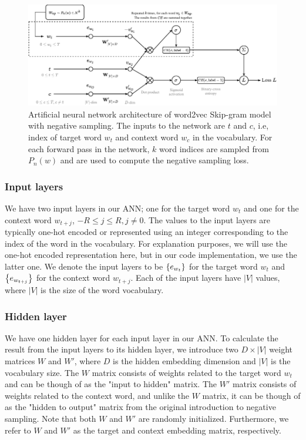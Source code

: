 \begin{figure}[ht]
    \centering
    \includegraphics[width=16cm]{thesis/figures/word2vec-sgns_cropped.pdf}
    \caption{Artificial neural network architecture of word2vec Skip-gram model with negative sampling. The inputs to the network are $t$ and $c$, i.e, index of target word $w_t$ and context word $w_c$ in the vocabulary. For each forward pass in the network, $k$ word indices are sampled from $P_n(w)$ and are used to compute the negative sampling loss.}
    \label{fig:word2vec-skip-gram-negative-sampling}
\end{figure}

\subsubsection{Input layers}
We have two input layers in our ANN; one for the target word $w_t$ and one for the context word $w_{t+j}$, $-R \leq j \leq R, j \neq 0$. The values to the input layers are typically one-hot encoded or represented using an integer corresponding to the index of the word in the vocabulary. For explanation purposes, we will use the one-hot encoded representation here, but in our code implementation, we use the latter one. We denote the input layers to be $\left\{e_{w_t}\right\}$ for the target word $w_t$ and $\left\{e_{w_{t+j}}\right\}$ for the context word $w_{t+j}$. Each of the input layers have $|V|$ values, where $|V|$ is the size of the word vocabulary.

\subsubsection{Hidden layer}
We have one hidden layer for each input layer in our ANN. To calculate the result from the input layers to its hidden layer, we introduce two $D \times |V|$ weight matrices $W$ and $W'$, where $D$ is the hidden embedding dimension and $|V|$ is the vocabulary size. The $W$ matrix consists of weights related to the target word $w_t$ and can be though of as the "input to hidden" matrix. The $W'$ matrix consists of weights related to the context word, and unlike the $W$ matrix, it can be though of as the "hidden to output" matrix from the original introduction to negative sampling. Note that both $W$ and $W'$ are randomly initialized. Furthermore, we refer to $W$ and $W'$ as the target and context embedding matrix, respectively.

